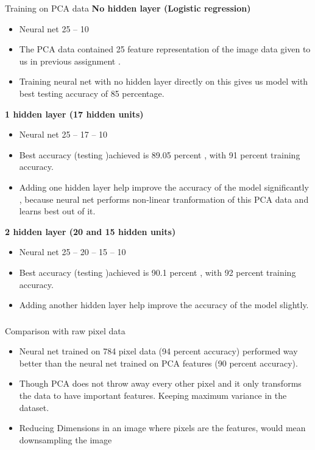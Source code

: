 \documentclass[12pt,t]{beamer}
\begin{document}
\begin{frame}{Training on PCA data}
    \scriptsize
    \textbf{No hidden layer (Logistic regression)}
    \begin{itemize}
        \item Neural net 25 -- 10
        \item The PCA data contained 25 feature representation of the image data given to us
            in previous assignment .
        \item Training neural net with no hidden layer directly on this gives us model with best 
            testing accuracy of 85 percentage.
    \end{itemize}

    \textbf{1 hidden layer (17 hidden units)}
    \begin{itemize}
        \item Neural net 25 -- 17 -- 10
        \item Best accuracy (testing )achieved is 89.05 percent , with 91 percent training accuracy.
        \item Adding one hidden layer help improve the accuracy of the model significantly , because
                neural net performs non-linear tranformation of this PCA data and learns best out of it. 
    \end{itemize}

    \textbf{2 hidden layer (20 and 15 hidden units)}
    \begin{itemize}
        \item Neural net 25 -- 20 -- 15 -- 10
        \item Best accuracy (testing )achieved is 90.1 percent , with 92 percent training accuracy.
        \item Adding another  hidden layer help improve the accuracy of the model slightly.
    \end{itemize}

    

\end{frame}

\begin{frame}
    \frametitle{}

    \begin{block}{Comparison with raw pixel data}
        \begin{itemize}
            \item Neural net trained on 784 pixel data  (94 percent accuracy) performed way better than the neural
                    net trained on PCA features (90 percent accuracy). 
            \item Though PCA does not throw away every other pixel and it only
                 transforms the data to have important features. Keeping maximum variance in the dataset.
            \item Reducing Dimensions in an image where pixels are the features, 
                would mean downsampling the image
        \end{itemize}
    \end{block}
    

\end{frame}
\end{document}
